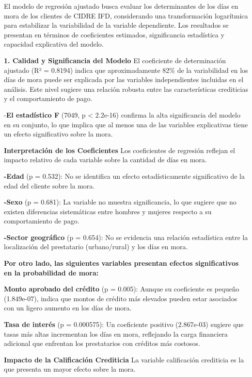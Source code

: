 \documentclass[Royal,times,sageh]{sagej}
\begin{document}
El modelo de regresión ajustado busca evaluar los determinantes de los
días en mora de los clientes de CIDRE IFD, considerando una
transformación logarítmica para estabilizar la variabilidad de la
variable dependiente. Los resultados se presentan en términos de
coeficientes estimados, significancia estadística y capacidad
explicativa del modelo.

\textbf{1. Calidad y Significancia del Modelo} El coeficiente de
determinación ajustado (R² = 0.8194) indica que aproximadamente 82\% de
la variabilidad en los días de mora puede ser explicada por las
variables independientes incluidas en el análisis. Este nivel sugiere
una relación robusta entre las características crediticias y el
comportamiento de pago.

-\textbf{El estadístico F} (7049, p \textless{} 2.2e-16) confirma la
alta significancia del modelo en su conjunto, lo que implica que al
menos una de las variables explicativas tiene un efecto significativo
sobre la mora.

\textbf{Interpretación de los Coeficientes} Los coeficientes de
regresión reflejan el impacto relativo de cada variable sobre la
cantidad de días en mora.

\textbf{-Edad} (p = 0.532): No se identifica un efecto estadísticamente
significativo de la edad del cliente sobre la mora.

\textbf{-Sexo} (p = 0.681): La variable no muestra significancia, lo que
sugiere que no existen diferencias sistemáticas entre hombres y mujeres
respecto a su comportamiento de pago.

\textbf{-Sector geográfico} (p = 0.654): No se evidencia una relación
estadística entre la localización del prestatario (urbano/rural) y los
días en mora.

\textbf{Por otro lado, las siguientes variables presentan efectos
significativos en la probabilidad de mora:}

\textbf{Monto aprobado del crédito} (p = 0.005): Aunque su coeficiente
es pequeño (1.849e-07), indica que montos de crédito más elevados pueden
estar asociados con un ligero aumento en los días de mora.

\textbf{Tasa de interés} (p = 0.000575): Un coeficiente positivo
(2.867e-03) sugiere que tasas más altas incrementan los días en mora,
reflejando la carga financiera adicional que enfrentan los prestatarios
con créditos más costosos.

\textbf{Impacto de la Calificación Crediticia} La variable calificación
crediticia es la que presenta un mayor efecto sobre la mora.
\end{document}
